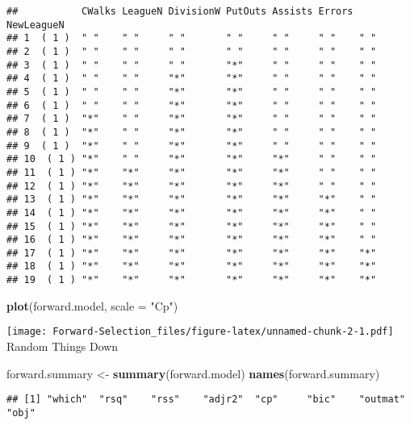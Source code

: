 \documentclass[
]{article}
\newenvironment{Shaded}{\begin{snugshade}}{\end{snugshade}}
\newcommand{\DataTypeTok}[1]{\textcolor[rgb]{0.13,0.29,0.53}{#1}}
\newcommand{\KeywordTok}[1]{\textcolor[rgb]{0.13,0.29,0.53}{\textbf{#1}}}
\newcommand{\NormalTok}[1]{#1}
\newcommand{\StringTok}[1]{\textcolor[rgb]{0.31,0.60,0.02}{#1}}
\begin{document}
\begin{verbatim}
##           CWalks LeagueN DivisionW PutOuts Assists Errors NewLeagueN
## 1  ( 1 )  " "    " "     " "       " "     " "     " "    " "       
## 2  ( 1 )  " "    " "     " "       " "     " "     " "    " "       
## 3  ( 1 )  " "    " "     " "       "*"     " "     " "    " "       
## 4  ( 1 )  " "    " "     "*"       "*"     " "     " "    " "       
## 5  ( 1 )  " "    " "     "*"       "*"     " "     " "    " "       
## 6  ( 1 )  " "    " "     "*"       "*"     " "     " "    " "       
## 7  ( 1 )  "*"    " "     "*"       "*"     " "     " "    " "       
## 8  ( 1 )  "*"    " "     "*"       "*"     " "     " "    " "       
## 9  ( 1 )  "*"    " "     "*"       "*"     " "     " "    " "       
## 10  ( 1 ) "*"    " "     "*"       "*"     "*"     " "    " "       
## 11  ( 1 ) "*"    "*"     "*"       "*"     "*"     " "    " "       
## 12  ( 1 ) "*"    "*"     "*"       "*"     "*"     " "    " "       
## 13  ( 1 ) "*"    "*"     "*"       "*"     "*"     "*"    " "       
## 14  ( 1 ) "*"    "*"     "*"       "*"     "*"     "*"    " "       
## 15  ( 1 ) "*"    "*"     "*"       "*"     "*"     "*"    " "       
## 16  ( 1 ) "*"    "*"     "*"       "*"     "*"     "*"    " "       
## 17  ( 1 ) "*"    "*"     "*"       "*"     "*"     "*"    "*"       
## 18  ( 1 ) "*"    "*"     "*"       "*"     "*"     "*"    "*"       
## 19  ( 1 ) "*"    "*"     "*"       "*"     "*"     "*"    "*"
\end{verbatim}

\begin{Shaded}
\begin{Highlighting}[]
\KeywordTok{plot}\NormalTok{(forward.model, }\DataTypeTok{scale =} \StringTok{"Cp"}\NormalTok{)}
\end{Highlighting}
\end{Shaded}

\texttt{[image: Forward-Selection\_files/figure-latex/unnamed-chunk-2-1.pdf]}
Random Things Down

\begin{Shaded}
\begin{Highlighting}[]
\NormalTok{forward.summary <-}\StringTok{ }\KeywordTok{summary}\NormalTok{(forward.model)}
\KeywordTok{names}\NormalTok{(forward.summary)}
\end{Highlighting}
\end{Shaded}

\begin{verbatim}
## [1] "which"  "rsq"    "rss"    "adjr2"  "cp"     "bic"    "outmat" "obj"
\end{verbatim}
\end{document}

